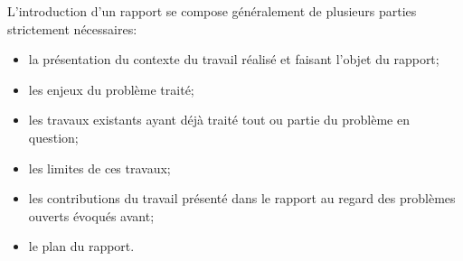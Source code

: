 \documentclass[a4paper,11pt]{scrbook}
\begin{document}
L'introduction d'un rapport se compose généralement de plusieurs parties strictement nécessaires:
\begin{itemize}
\item la présentation du contexte du travail réalisé et faisant l'objet du rapport;
\item les enjeux du problème traité;
\item les travaux existants ayant déjà traité tout ou partie du problème en question;
\item les limites de ces travaux;
\item les contributions du travail présenté dans le rapport au regard des problèmes ouverts évoqués avant;
\item le plan du rapport.
\end{itemize}
\end{document}

